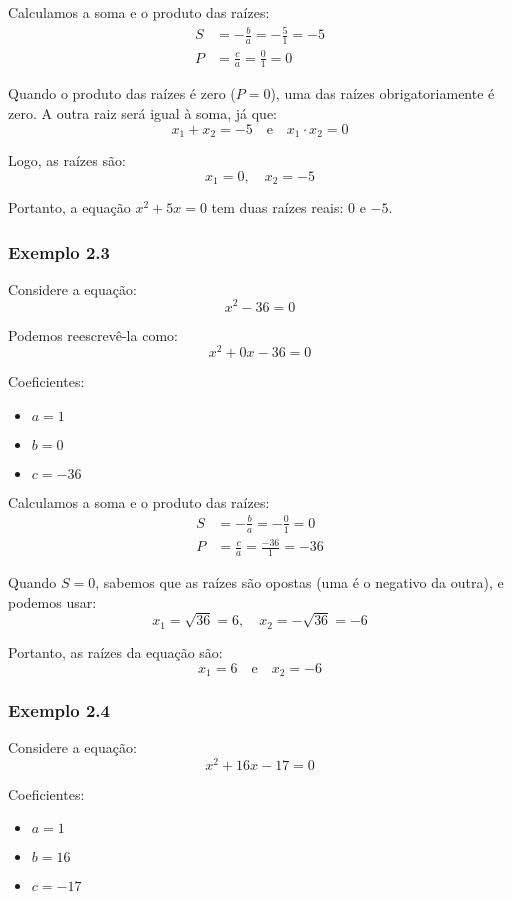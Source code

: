 \documentclass[12pt]{report}
\newcommand{\1}{\faThermometerEmpty}
\newcommand{\2}{\faThermometerQuarter}
\newcommand{\3}{\faThermometerHalf}
\newcommand{\4}{\faThermometerThreeQuarters}
\newcommand{\5}{\faThermometerFull}
\begin{document}
Calculamos a soma e o produto das raízes:
\[
\begin{aligned}
    S &= -\frac{b}{a} = -\frac{5}{1} = -5 \\
    P &= \frac{c}{a} = \frac{0}{1} = 0
\end{aligned}
\]

Quando o produto das raízes é zero ($P = 0$), uma das raízes obrigatoriamente é zero. A outra raiz será igual à soma, já que:
$$ x_1 + x_2 = -5 \quad \text{e} \quad x_1 \cdot x_2 = 0 $$

Logo, as raízes são:
\[
x_1 = 0, \quad x_2 = -5
\]

Portanto, a equação \( x^2 + 5x = 0 \) tem duas raízes reais: $0$ e $-5$.



\subsubsection*{Exemplo 2.3}

Considere a equação:
$$ x^2 - 36 = 0 $$

Podemos reescrevê-la como:
$$ x^2 + 0x - 36 = 0 $$

Coeficientes:
\begin{itemize}
    \item $a = 1$
    \item $b = 0$
    \item $c = -36$
\end{itemize}

Calculamos a soma e o produto das raízes:
\[
\begin{aligned}
    S &= -\frac{b}{a} = -\frac{0}{1} = 0 \\
    P &= \frac{c}{a} = \frac{-36}{1} = -36
\end{aligned}
\]

Quando $S = 0$, sabemos que as raízes são opostas (uma é o negativo da outra), e podemos usar:
\[
x_1 = \sqrt{36} = 6, \quad x_2 = -\sqrt{36} = -6
\]

Portanto, as raízes da equação são:
\[
x_1 = 6 \quad \text{e} \quad x_2 = -6
\]



\subsubsection*{Exemplo 2.4}

Considere a equação:
$$ x^2 + 16x - 17 = 0 $$

Coeficientes:
\begin{itemize}
    \item $a = 1$
    \item $b = 16$
    \item $c = -17$
\end{itemize}
\end{document}
